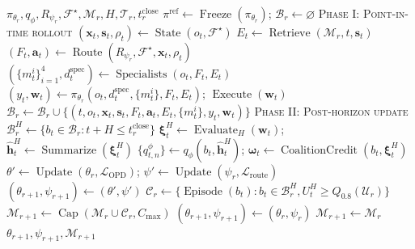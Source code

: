 \begin{algorithm}[t]
\caption{\textsc{FinOPD}: One Self-Evolution Round}
\label{alg:finopd}
\footnotesize
\begin{algorithmic}[1]
\REQUIRE $\pi_{\theta_r},q_{\phi},R_{\psi_r},\mathcal F^\star,\mathcal M_r,H,\mathcal T_r,t_r^{\mathrm{close}}$
\STATE $\pi^{\mathrm{ref}}\gets\operatorname{Freeze}(\pi_{\theta_r})$;
$\mathcal B_r\gets\varnothing$
\STATE \textsc{Phase I: Point-in-time rollout}
\STATE $(\mathbf x_t,\mathbf s_t,\rho_t)\gets\operatorname{State}(o_t,\mathcal F^\star)$
\STATE $E_t\gets\operatorname{Retrieve}(\mathcal M_r,t,\mathbf s_t)$
\STATE $(F_t,\mathbf a_t)\gets\operatorname{Route}(R_{\psi_r},\mathcal F^\star,\mathbf x_t,\rho_t)$
\STATE $(\{m_t^i\}_{i=1}^{4},d_t^{\mathrm{spec}})
\gets\operatorname{Specialists}(o_t,F_t,E_t)$
\STATE $(y_t,\mathbf w_t)\gets\pi_{\theta_r}(o_t,d_t^{\mathrm{spec}},\{m_t^i\},F_t,E_t)$;
$\operatorname{Execute}(\mathbf w_t)$
\STATE $\mathcal B_r\gets\mathcal B_r\cup
\{(t,o_t,\mathbf x_t,\mathbf s_t,F_t,\mathbf a_t,E_t,\{m_t^i\},y_t,\mathbf w_t)\}$
\ENDFOR
\STATE \textsc{Phase II: Post-horizon update}
\STATE $\mathcal B_r^H\gets\{b_t\in\mathcal B_r:t+H\leq t_r^{\mathrm{close}}\}$
\STATE $\boldsymbol\xi_t^H\gets\operatorname{Evaluate}_H(\mathbf w_t)$;
$\widehat{\mathbf h}_t^H\gets\operatorname{Summarize}(\boldsymbol\xi_t^H)$
\STATE $\{q_{t,n}^{\phi}\}\gets q_{\phi}(b_t,\widehat{\mathbf h}_t^H)$;
$\boldsymbol\omega_t\gets\operatorname{CoalitionCredit}(b_t,\boldsymbol\xi_t^H)$
\ENDFOR
\STATE $\theta'\gets\operatorname{Update}(\theta_r,\mathcal L_{\mathrm{OPD}})$;
$\psi'\gets\operatorname{Update}(\psi_r,\mathcal L_{\mathrm{route}})$
\STATE $(\theta_{r+1},\psi_{r+1})\gets(\theta',\psi')$
\STATE $\mathcal C_r\gets\{\operatorname{Episode}(b_t):
b_t\in\mathcal B_r^H,U_t^H\geq Q_{0.8}(\mathcal U_r)\}$
\STATE $\mathcal M_{r+1}\gets\operatorname{Cap}(\mathcal M_r\cup\mathcal C_r,C_{\max})$
\ELSE
\STATE $(\theta_{r+1},\psi_{r+1})\gets(\theta_r,\psi_r)$
\STATE $\mathcal M_{r+1}\gets\mathcal M_r$
\ENDIF
\RETURN $\theta_{r+1},\psi_{r+1},\mathcal M_{r+1}$
\end{algorithmic}
\end{algorithm}
\endgroup
